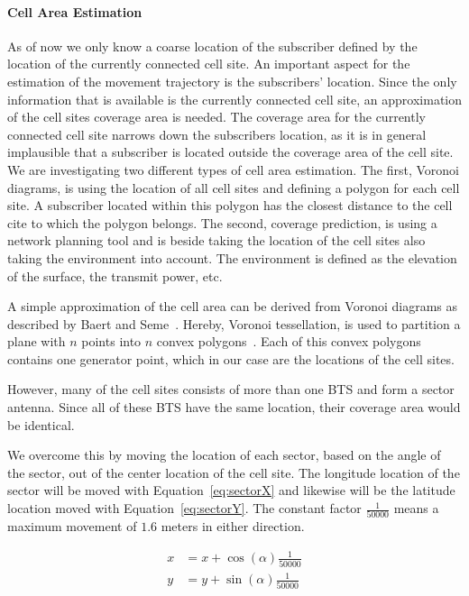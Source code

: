 \documentclass[twocolumn]{bmcart}%
\begin{document}
\paragraph*{Cell Area Estimation}
As of now we only know a coarse location of the subscriber defined by the location of the currently connected cell site. An important aspect for the estimation of the movement trajectory is the subscribers' location. Since the only information that is available is the currently connected cell site, an approximation of the cell sites coverage area is needed. The coverage area for the currently connected cell site narrows down the subscribers location, as it is in general implausible that a subscriber is located outside the coverage area of the cell site. We are investigating two different types of cell area estimation. The first, Voronoi diagrams, is using the location of all cell sites and defining a polygon for each cell site. A subscriber located within this polygon has the closest distance to the cell cite to which the polygon belongs. The second, coverage prediction, is using a network planning tool and is beside taking the location of the cell sites also taking the environment into account. The environment is defined as the elevation of the surface, the transmit power, etc. \newline


A simple approximation of the cell area can be derived from Voronoi diagrams as described by Baert and Seme~\cite{Baert2004}. Hereby, Voronoi tessellation, is used to partition a plane with $n$ points into $n$ convex polygons~\cite{Aurenhammer1991}. Each of this convex polygons contains one generator point, which in our case are the locations of the cell sites. 

However, many of the cell sites consists of more than one BTS and form a sector antenna. Since all of these BTS have the same location, their coverage area would be identical. 

We overcome this by moving the location of each sector, based on the angle of the sector, out of the center location of the cell site. The longitude location of the sector will be moved with Equation~\ref{eq:sectorX} and likewise will be the latitude location moved with Equation~\ref{eq:sectorY}. The constant factor $\frac{1}{50000}$ means a maximum movement of $1.6$ meters in either direction.

\begin{align}
x & =x+\cos(\alpha)\frac{1}{50000}\label{eq:sectorX}\\
y & =y+\sin(\alpha)\frac{1}{50000} \label{eq:sectorY}
\end{align}
\newline
\end{document}

